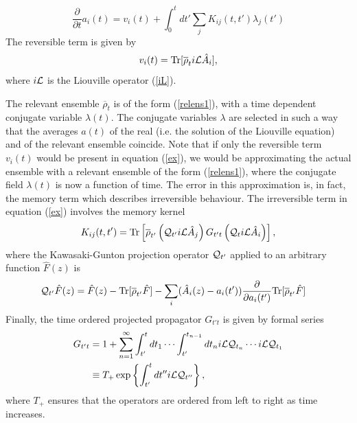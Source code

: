 \documentclass[b5paper,openright,10pt]{book}
\begin{document}
\begin{equation}
\frac{\partial }{\partial t} a_i(t)
= v_i(t) + \int_0^t dt' \sum_j K_{ij}(t,t') \lambda_j(t')
\label{ex}
\end{equation}
The reversible term is given by
\begin{equation}
  v_i(t) = {\rm Tr}[\overline{\rho}_t  i{\cal L} \hat{A}_i],
\label{vit}
\end{equation}
where $i{\cal L}$ is the Liouville operator (\ref{iL}).

The  relevant
ensemble $\overline{\rho}_t$  is of  the form (\ref{relens1}),  with a
time   dependent  conjugate   variable  $\lambda(t)$.   The  conjugate
variables  $\lambda$ are  selected in  such  a way  that the  averages
$a(t)$ of the  real (i.e. the  solution of the Liouville equation) and of the relevant ensemble  coincide.  Note that
if   only  the   reversible  term   $v_i(t)$  would   be  present   in
equation (\ref{ex}), we would be  approximating the actual ensemble 
with a relevant  ensemble of
the form (\ref{relens1}), where the conjugate field $\lambda(t)$ is now
a function of time.  The error  in this approximation is, in fact, the
memory term which describes  irreversible behaviour.  The irreversible
term in equation (\ref{ex}) involves the memory kernel
\begin{equation}
K_{ij}(t,t') =
{\rm Tr}\left[\overline{\rho}_{t'} 
  \left({\cal Q}_{t'} i{\cal L}\hat{A}_j\right) G_{t't}
\left({\cal Q}_{t } i{\cal L}\hat{A}_i\right)\right],
\label{ker}
\end{equation}
where   the  Kawasaki-Gunton   projection  operator   ${\cal  Q}_{t'}$
\cite{Kawasaki1973a,  Grabert1982}  applied  to an  arbitrary  function
$\hat{F}(z)$ is
\begin{align}
  {\cal Q}_{t'}\hat{F}(z) &= \hat{F}(z)- {\rm Tr}[\overline{\rho}_{t'} \hat{F}]
-\sum_i(\hat{A}_i(z)-a_i(t'))\frac{\partial }{\partial a_i(t')}
{\rm Tr}[\overline{\rho}_{t'} \hat{F}]
\label{Q}
\end{align}
Finally, the time ordered projected propagator $G_{t't}$ is given by formal series
\begin{align}
  G_{t't}&=1
+\sum_{n=1}^\infty \int_{t'}^tdt_1\cdots\int_{t'}^{t_{n-1}}dt_n
i{\cal L}{\cal Q}_{t_n}\cdots  i{\cal L}{\cal Q}_{t_1}
\nonumber\\
&\equiv T_+\exp\left\{\int_{t'}^t dt''  i{\cal L}{\cal Q}_{t''}\right\},
\end{align}
where $T_+$ ensures that the operators are ordered from left to right as time increases.
\end{document}
